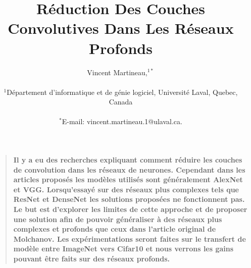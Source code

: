 \documentclass[12pt]{article}
\title{Réduction Des Couches Convolutives Dans Les Réseaux Profonds}
\author
{Vincent Martineau,$^{1\ast}$\\
\\
\normalsize{$^{1}$Département d'informatique et de génie logiciel, Université Laval, Quebec, Canada}\\
\\
\normalsize{$^\ast$E-mail:  vincent.martineau.1@ulaval.ca.}
}
\date{}
\newenvironment{sciabstract}{%
\begin{quote} \bf}
{\end{quote}}
\begin{document}
 


\baselineskip24pt


\maketitle 




\begin{sciabstract}
  Il y a eu des recherches expliquant comment réduire les couches de convolution dans les réseaux de neurones. Cependant dans les articles proposés les modèles utilisés sont généralement AlexNet et VGG. Lorsqu'essayé sur des réseaux plus complexes tels que ResNet et DenseNet les solutions proposées ne fonctionnent pas. Le but est d'explorer les limites de cette approche et de proposer une solution afin de pouvoir généraliser à des réseaux plus complexes et profonds que ceux dans l'article original de Molchanov. Les expérimentations seront faites sur le transfert de modèle entre ImageNet vers Cifar10 et nous verrons les gains pouvant être faits sur des réseaux profonds. 
\end{sciabstract}



\end{document}

